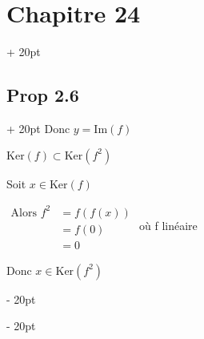 \documentclass[12pt]{article}
\newcommand{\ind}[1][20pt]{\advance\leftskip + #1}
\newcommand{\deind}[1][20pt]{\advance\leftskip - #1}
\newenvironment{indt}[2][20pt]{#2 \par \ind[#1]}{\par \deind}
\begin{document}
\begin{indt}{\section*{Chapitre 24}}
\begin{indt}{\subsection*{Prop 2.6}}
      Donc $y=\mathrm{Im}(f)$

      \vspace{10pt}

      \underline{$\mathrm{Ker}(f)\subset\mathrm{Ker}(f^2)$}

      Soit $x\in\mathrm{Ker}(f)$

      $\begin{array}{lll}
        \text{Alors } f^2 & =f(f(x))
        \\
        & =f(0)
        \\
        & =0
      \end{array}$
      où f linéaire

      Donc $x\in\mathrm{Ker}(f^2)$

    \end{indt}
  \end{indt}
\end{document}
